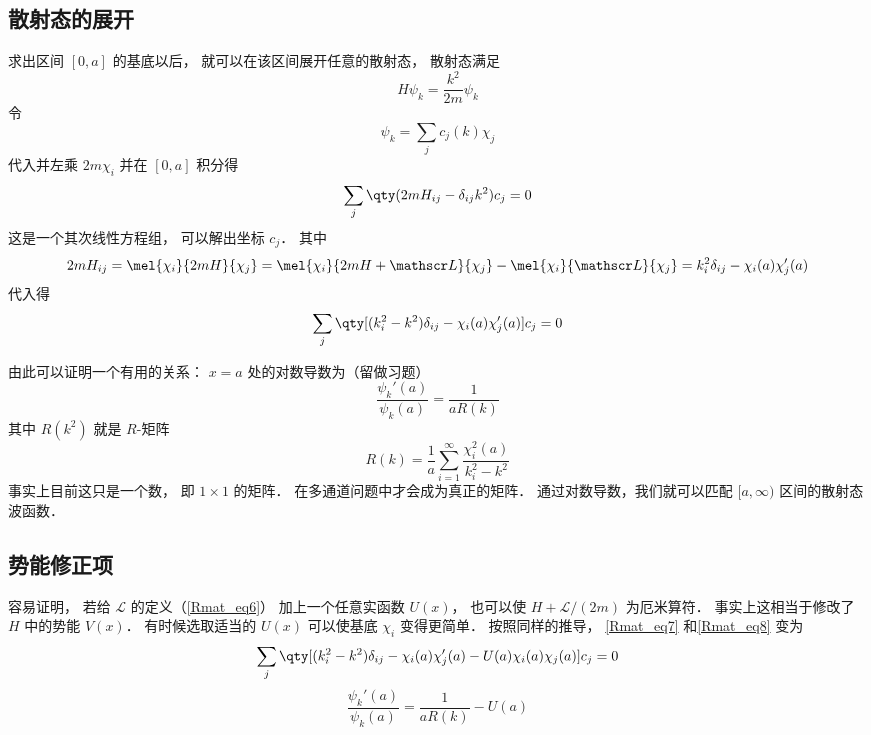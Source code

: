 \subsection{散射态的展开}
求出区间 $[0,a]$ 的基底以后， 就可以在该区间展开任意的散射态， 散射态满足
\begin{equation}\label{Rmat_eq4}
H\psi_k = \frac{k^2}{2m}\psi_k
\end{equation}
令
\begin{equation}\label{Rmat_eq5}
\psi_k = \sum_j c_j(k)\chi_j
\end{equation}
代入并左乘 $2m\chi_i$ 并在 $[0,a]$ 积分得
\begin{equation}
\sum_j \qty(2mH_{ij} - \delta_{ij}k^2) c_j = 0
\end{equation}
这是一个其次线性方程组， 可以解出坐标 $c_j$． 其中
\begin{equation}
2mH_{ij} = \mel{\chi_i}{2mH}{\chi_j} = \mel{\chi_i}{2mH + \mathscr L}{\chi_j} - \mel{\chi_i}{\mathscr L}{\chi_j} 
= k_i^2\delta_{ij} - \chi_i(a)\chi'_j(a)
\end{equation}
代入得
\begin{equation}\label{Rmat_eq7}
\sum_j \qty[(k_i^2 - k^2)\delta_{ij} - \chi_i(a)\chi'_j(a)] c_j = 0
\end{equation}

由此可以证明一个有用的关系： $x=a$ 处的对数导数为（留做习题）
\begin{equation}\label{Rmat_eq8}
\frac{\psi_k'(a)}{\psi_k(a)} = \frac{1}{aR(k)}
\end{equation}
其中 $R(k^2)$ 就是 $R$-矩阵
\begin{equation}
R(k) = \frac{1}{a} \sum_{i=1}^\infty \frac{\chi_i^2(a)}{k_i^2 - k^2}
\end{equation}
事实上目前这只是一个数， 即 $1\times 1$ 的矩阵． 在多通道问题中才会成为真正的矩阵． 通过对数导数，我们就可以匹配 $[a,\infty)$ 区间的散射态波函数．

\subsection{势能修正项}
容易证明， 若给 $\mathscr L$ 的定义（\autoref{Rmat_eq6}） 加上一个任意实函数 $U(x)$， 也可以使 $H+\mathscr L/(2m)$ 为厄米算符． 事实上这相当于修改了 $H$ 中的势能 $V(x)$． 有时候选取适当的 $U(x)$ 可以使基底 $\chi_i$ 变得更简单． 按照同样的推导， \autoref{Rmat_eq7} 和\autoref{Rmat_eq8} 变为
\begin{equation}
\sum_j \qty[(k_i^2 - k^2)\delta_{ij} - \chi_i(a)\chi'_j(a) - U(a)\chi_i(a)\chi_j(a)] c_j = 0
\end{equation}
\begin{equation}
\frac{\psi_k'(a)}{\psi_k(a)} = \frac{1}{aR(k)} - U(a)
\end{equation}
